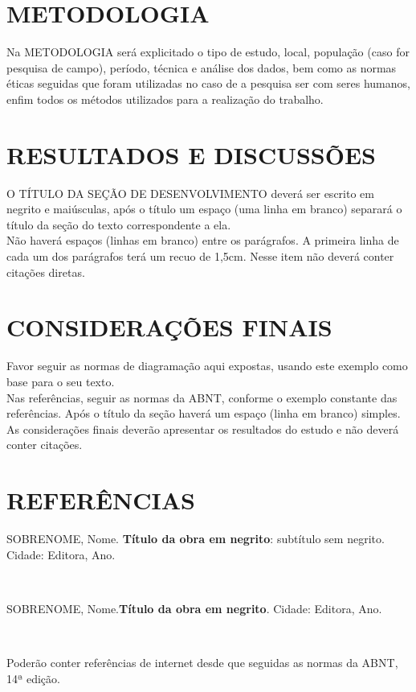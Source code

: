 \documentclass[12pt]{article}
\begin{document}
{\section*{\large METODOLOGIA}

    Na METODOLOGIA será explicitado o tipo de estudo, local, população (caso for pesquisa de campo), período, técnica e análise dos dados, bem como as normas éticas seguidas que foram utilizadas no caso de a pesquisa ser com seres humanos, enfim todos os métodos utilizados para a realização do trabalho. \\


\section*{\large RESULTADOS E DISCUSSÕES}

    O TÍTULO DA SEÇÃO DE DESENVOLVIMENTO deverá ser escrito em negrito e maiúsculas, após o título um espaço (uma linha em branco) separará o título da seção do texto correspondente a ela.\\ 
    Não haverá espaços (linhas em branco) entre os parágrafos. A primeira linha de cada um dos parágrafos terá um recuo de 1,5cm. Nesse item não deverá conter citações diretas. \\


\section*{\large CONSIDERAÇÕES FINAIS}

    Favor seguir as normas de diagramação aqui expostas, usando este exemplo como base para o seu texto. \\
    Nas referências, seguir as normas da ABNT, conforme o exemplo constante das referências. Após o título da seção haverá um espaço (linha em branco) simples.\\
    As considerações finais deverão apresentar os resultados do estudo e não deverá conter citações. \\



\section*{\large REFERÊNCIAS}


\begin{flushleft}

SOBRENOME, Nome. \textbf{Título da obra em negrito}: subtítulo sem negrito. Cidade: Editora, Ano. 

\

SOBRENOME, Nome.\textbf{Título da obra em negrito}. Cidade: Editora, Ano.

\

Poderão conter referências de internet desde que seguidas as normas da ABNT, 14ª edição. 



\end{flushleft}
}
\end{document}
